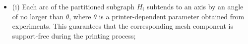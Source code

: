 \begin{itemize}
\item (i) Each arc of the partitioned subgraph $H_i$ subtends to an axis by an angle of no larger than $\theta$, where $\theta$ is a printer-dependent parameter obtained from experiments. This guarantees that the corresponding mesh component is support-free during the printing process;



\end{itemize}
